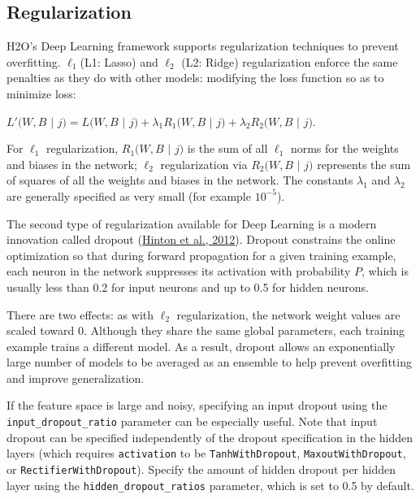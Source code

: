 \subsection{Regularization} 
\label{ssec:Regularization}
H2O's Deep Learning framework supports regularization techniques to prevent overfitting.  $\ell_1$(L1: Lasso) and $\ell_2$ (L2: Ridge) regularization enforce the same penalties as they do with other models: modifying the loss function so as to minimize loss: %
\medskip
\begin{center}
$L'(W,B$ $|$ $j) = L(W,B$ $|$ $j) + \lambda_1 R_1(W,B$ $|$ $j) + \lambda_2 R_2(W,B$ $|$ $j)$.
\end{center}
\medskip
For $\ell_1$ regularization, $R_1(W,B$ $|$ $j)$ is the sum of all $\ell_1$ norms for the weights and biases in the network; $\ell_2$ regularization via $R_2(W,B$ $|$ $j)$ represents the sum of squares of all the weights and biases in the network. The constants $\lambda_1$ and $\lambda_2$ are generally specified as very small (for example $10^{-5}$).

The second type of regularization available for Deep Learning is a modern innovation called dropout (\href{http://arxiv.org/pdf/1207.0580.pdf}{Hinton et al., 2012}). %
Dropout constrains the online optimization so that during forward propagation for a given training example, each neuron in the network suppresses its activation with probability $P$, which is usually less than 0.2 for input neurons and up to 0.5 for hidden neurons. 

There are two effects: as with $\ell_2$ regularization, the network weight values are scaled toward 0.  Although they share the same global parameters, each training example trains a different model. As a result, dropout allows an exponentially large number of models to be averaged as an ensemble to help prevent overfitting and improve generalization. 

If the feature space is large and noisy, specifying an input dropout using the \texttt{input\_dropout\_ratio} parameter can be especially useful. Note that input dropout can be specified independently of the dropout specification in the hidden layers (which requires \texttt{activation} to be \texttt{TanhWithDropout},  \texttt{MaxoutWithDropout}, or \texttt{RectifierWithDropout}). Specify the amount of hidden dropout per hidden layer using the \texttt{hidden\_dropout\_ratios} parameter, which is set to 0.5 by default.

